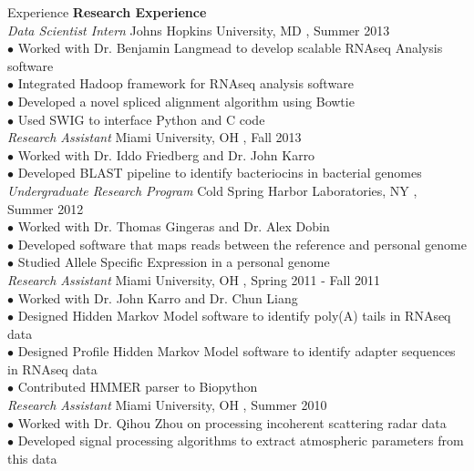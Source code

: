 \documentclass{resume} %
\begin{document}
\begin{rSection}{Experience}
  \textbf{Research Experience}\\[1 mm]
  \textit{Data Scientist Intern} \hfill Johns Hopkins University, MD , Summer 2013 \\ [1 mm]
  $\bullet$ Worked with Dr. Benjamin Langmead to develop scalable RNAseq Analysis software \\
  $\bullet$ Integrated Hadoop framework for RNAseq analysis software \\
  $\bullet$ Developed a novel spliced alignment algorithm using Bowtie \\
  $\bullet$ Used SWIG to interface Python and C code \\
  \textit{Research Assistant} \hfill Miami University, OH , Fall 2013\\[1 mm]
  $\bullet$ Worked with Dr. Iddo Friedberg and Dr. John Karro\\
  $\bullet$ Developed BLAST pipeline to identify bacteriocins in bacterial genomes\\ \newpage
  \textit{Undergraduate Research Program} \hfill Cold Spring Harbor Laboratories, NY , Summer 2012 \\ [1 mm]
  $\bullet$ Worked with Dr. Thomas Gingeras and Dr. Alex Dobin\\
  $\bullet$ Developed software that maps reads between the reference and personal genome \\
  $\bullet$ Studied Allele Specific Expression in a personal genome \\ 
  \textit{Research Assistant} \hfill Miami University, OH , Spring 2011 - Fall 2011 \\ [1 mm]
  $\bullet$ Worked with Dr. John Karro and Dr. Chun Liang\\
  $\bullet$ Designed Hidden Markov Model software to identify poly(A) tails in RNAseq data\\
  $\bullet$ Designed Profile Hidden Markov Model software to identify adapter sequences in RNAseq data\\
  $\bullet$ Contributed HMMER parser to Biopython\\[3 mm]
  \textit{Research Assistant} \hfill Miami University, OH , Summer 2010 \\ [1 mm]
  $\bullet$ Worked with Dr. Qihou Zhou on processing incoherent scattering radar data\\
  $\bullet$ Developed signal processing algorithms to extract atmospheric parameters from this data\\[3 mm]

\end{rSection}
\end{document}
